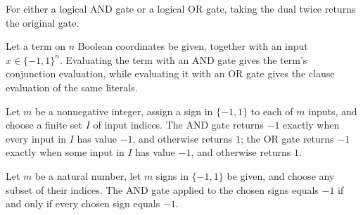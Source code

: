 \begin{theorem}
\label{FABL.CircuitGate.dual_dual}
\leanok
{}
For either a logical AND gate or a logical OR gate, taking the dual twice returns the
original gate.
\end{theorem}

\begin{definition}
\label{FABL.CircuitGate.evalTerm}
\leanok
{}
Let a term on $n$ Boolean coordinates be given, together with an input $x\in\{-1,1\}^n$.
Evaluating the term with an AND gate gives the term's conjunction evaluation, while
evaluating it with an OR gate gives the clause evaluation of the same literals.
\end{definition}

\begin{definition}
\label{FABL.CircuitGate.evalFinset}
\leanok
{}
Let $m$ be a nonnegative integer, assign a sign in $\{-1,1\}$ to each of $m$ inputs, and
choose a finite set $I$ of input indices. The AND gate returns $-1$ exactly when every
input in $I$ has value $-1$, and otherwise returns $1$; the OR gate returns $-1$ exactly
when some input in $I$ has value $-1$, and otherwise returns $1$.
\end{definition}

\begin{theorem}
\label{FABL.CircuitGate.evalFinset_and_eq_neg_one_iff}
\leanok
{}
Let $m$ be a natural number, let $m$ signs in $\{ -1,1 \}$ be given, and choose any
subset of their indices. The AND gate applied to the chosen signs equals $-1$ if and
only if every chosen sign equals $-1$.
\end{theorem}

